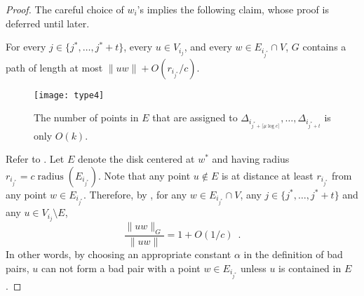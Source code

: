 \documentclass{patmorin}
\DeclareMathOperator{\radius}{radius}
\begin{document}
\begin{proof}
  The careful choice of $w_i$'s implies the following claim, whose proof
  is deferred until later.
  \begin{clm}
    For every $j\in\{j^*,\ldots,j^*+t\}$, every $u\in V_{i_j}$, and
    every $w\in E_{i_{j^*}}\cap V$, $G$ contains a path of length at most
    $\|uw\|+O(r_{i_{j^*}}/c)$.
  \end{clm}

  
  \begin{figure}
    \begin{center}
      \texttt{[image: type4]}
    \end{center}
    \caption{The number of points in $E$ that are assigned to
      $\Delta_{i_{j^*+\lceil\mu\log c\rceil}},\ldots,\Delta_{i_{j^*+t}}$
      is only $O(k)$.}
  \end{figure}

  Refer to .  Let $E$ denote the disk centered at $w^*$
  and having radius $r_{i_{j^*}}=c\radius(E_{i_{j^*}})$.  Note that
  any point $u\not\in E$ is at distance at least $r_{i_{j^*}}$ from
  any point $w\in E_{i_{j^*}}$.  Therefore, by , for any
  $w\in E_{i_{j^*}}\cap V$, any $j\in\{j^*,\ldots,j^*+t\}$ and any $u\in
  V_{i_{j}}\setminus E$,
  \[  
     \frac{\|uw\|_G}{\|uw\|} = 1+O(1/c) \enspace . 
  \]
  In other words, by choosing an appropriate constant $\alpha$ in the
  definition of bad pairs, $u$ can not form a bad pair with a point
  $w\in E_{i_{j^*}}$ unless $u$ is contained in $E$.



\end{proof}
\end{document}
